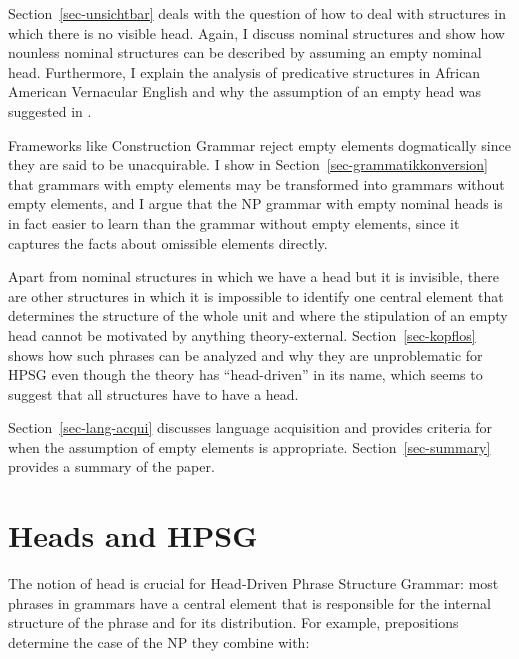 \documentclass[output=paper
  ,nobabel
  ,draftmode
  ,uniformtopskip %
  ,colorlinks, citecolor=brown
]{langscibook}
\begin{document}
Section~\ref{sec-unsichtbar} deals with the question of how to deal with structures in which there
is no visible head. Again, I discuss nominal structures and show how nounless nominal structures can
be described by assuming an empty nominal head. Furthermore, I explain the analysis of predicative
structures in African American Vernacular English and why the assumption of an empty head was
suggested in .

\largerpage[2]
Frameworks like Construction Grammar reject empty elements dogmatically \parencites[]{Goldberg2003b}[]{Goldberg2006a}[]{HT2013a-u}[]{Fillmore2013a-u}[]{Michaelis2013a-u} since they are said to be unacquirable. I show in
Section~\ref{sec-grammatikkonversion} that grammars with empty elements may be transformed into
grammars without empty elements, and I argue that the NP grammar with empty nominal heads is in fact
easier to learn than the grammar without empty elements, since it captures the facts about omissible
elements directly. 

Apart from nominal structures in which we have a head but it is invisible, there are other
structures in which it is impossible to identify one central element that determines the structure
of the whole unit and where the stipulation of an empty head cannot be motivated by anything theory-external. 
Section~\ref{sec-kopflos} shows how such phrases can be analyzed and why they are
unproblematic for HPSG even though the theory has ``head-driven'' in its name, which seems to
suggest that all structures have to have a head. 

Section~\ref{sec-lang-acqui} discusses language acquisition and provides criteria for when the
assumption of empty elements is appropriate. Section~\ref{sec-summary} provides a summary of the paper.


\section{Heads and HPSG}
\label{sec-koepfe-in-hpsg}
        
The notion of head is crucial for Head-Driven Phrase Structure Grammar: most phrases in grammars
have a central element that is responsible for the internal structure of the phrase and for its
distribution. For example, prepositions determine the case of the NP they combine with:
\eal
{}
\zl
\end{document}
